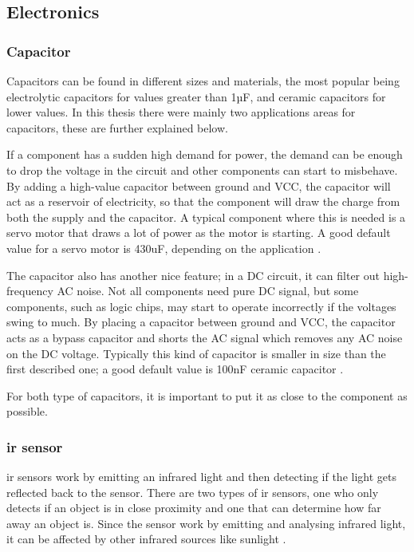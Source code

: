 \subsection{Electronics}
\subsubsection{Capacitor}
\label{sec:capacitor}
Capacitors can be found in different sizes and materials, the most popular being electrolytic capacitors for values greater than 1µF, and ceramic capacitors for lower values. In this thesis there were mainly two applications areas for capacitors, these are further explained below.

If a component has a sudden high demand for power, the demand can be enough to drop the voltage in the circuit and other components can start to misbehave. By adding a high-value capacitor between ground and VCC, the capacitor will act as a reservoir of electricity, so that the component will draw the charge from both the supply and the capacitor. A typical component where this is needed is a servo motor that draws a lot of power as the motor is starting. A good default value for a servo motor is 430uF, depending on the application \cite{highcapacitor}.

The capacitor also has another nice  feature; in a DC circuit, it can filter out high-frequency AC noise. Not all components need pure DC signal, but some components, such as logic chips, may start to operate incorrectly if the voltages swing to much. By placing a capacitor between ground and VCC, the capacitor acts as a bypass capacitor and shorts the AC signal which removes any AC noise on the DC voltage. Typically this kind of capacitor is smaller in size than the first described one; a good default value is 100nF ceramic capacitor \cite{lowcapacitor}.

For both type of capacitors, it is important to put it as close to the component as possible.

\subsubsection{\acrlong{ir} sensor}
\acrfull{ir} sensors work by emitting an infrared light and then detecting if the light gets reflected back to the sensor. There are two types of \acrshort{ir} sensors, one who only detects if an object is in close proximity and one that can determine how far away an object is. Since the sensor work by emitting and analysing infrared light, it can be affected by other infrared sources like sunlight \cite{infrared}. 

